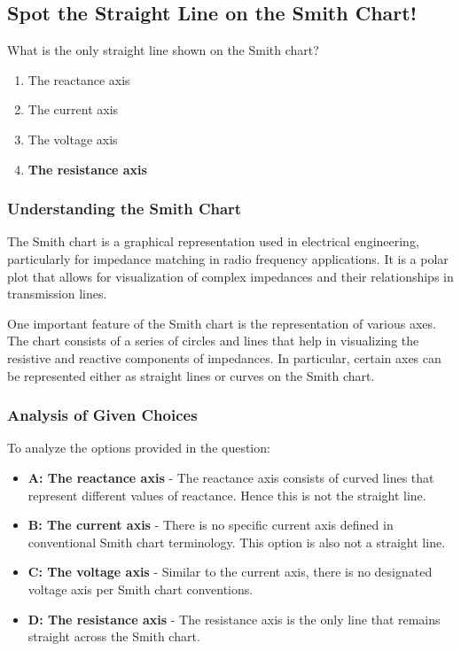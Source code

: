 \subsection{Spot the Straight Line on the Smith Chart!}

\begin{tcolorbox}[colback=gray!10, colframe=black, title=E9G07] What is the only straight line shown on the Smith chart? 

\begin{enumerate}[label=\Alph*.]
    \item The reactance axis
    \item The current axis
    \item The voltage axis
    \item \textbf{The resistance axis}
\end{enumerate} \end{tcolorbox}

\subsubsection{Understanding the Smith Chart}

The Smith chart is a graphical representation used in electrical engineering, particularly for impedance matching in radio frequency applications. It is a polar plot that allows for visualization of complex impedances and their relationships in transmission lines.

One important feature of the Smith chart is the representation of various axes. The chart consists of a series of circles and lines that help in visualizing the resistive and reactive components of impedances. In particular, certain axes can be represented either as straight lines or curves on the Smith chart.

\subsubsection{Analysis of Given Choices}

To analyze the options provided in the question:

\begin{itemize}
    \item \textbf{A: The reactance axis} - The reactance axis consists of curved lines that represent different values of reactance. Hence this is not the straight line.
    \item \textbf{B: The current axis} - There is no specific current axis defined in conventional Smith chart terminology. This option is also not a straight line.
    \item \textbf{C: The voltage axis} - Similar to the current axis, there is no designated voltage axis per Smith chart conventions.
    \item \textbf{D: The resistance axis} - The resistance axis is the only line that remains straight across the Smith chart. 
\end{itemize}

